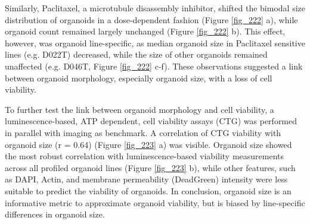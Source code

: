 \begin{flushleft}
Similarly, Paclitaxel, a microtubule disassembly inhibitor, shifted the bimodal size distribution of organoids in a dose-dependent fashion (Figure \ref{fig_222} a), while organoid count remained largely unchanged (Figure \ref{fig_222} b). This effect, however, was organoid line-specific, as median organoid size in Paclitaxel sensitive lines (e.g. D022T) decreased, while the size of other organoids remained unaffected (e.g. D046T, Figure \ref{fig_222} c-f). These observations suggested a link between organoid morphology, especially organoid size, with a loss of cell viability. 

\bigbreak
To further test the link between organoid morphology and cell viability, a luminescence-based, ATP dependent, cell viability assays (CTG) was performed in parallel with imaging as benchmark. A correlation of CTG viability with organoid size (r = 0.64) (Figure \ref{fig_223} a) was visible. Organoid size showed the most robust correlation with luminescence-based viability measurements across all profiled organoid lines (Figure \ref{fig_223} b), while other features, such as DAPI, Actin, and membrane permeability (DeadGreen) intensity were less suitable to predict the viability of organoids. In conclusion, organoid size is an informative metric to approximate organoid viability, but is biased by line-specific differences in organoid size.



\end{flushleft}
